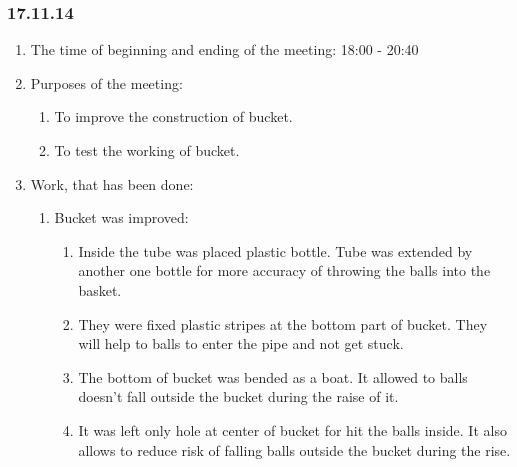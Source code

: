 
\subsubsection{17.11.14}

\begin{enumerate} 
	\item The time of beginning and ending of the meeting:
	18:00 - 20:40
	\item Purposes of the meeting:
	\begin{enumerate}
		\item To improve the construction of bucket.
		
		\item To test the working of bucket.
		
	\end{enumerate}
	
	\item Work, that has been done:
	\begin{enumerate}
		\item Bucket was improved:
		\begin{enumerate}
			\item Inside the tube was placed plastic bottle. Tube was extended by another one bottle for more accuracy of throwing the balls into the basket.
			
			\item They were fixed plastic stripes at the bottom part of bucket. They will help to balls to enter the pipe and not get stuck.
			
			\item The bottom of bucket was bended as a boat. It allowed to balls doesn't fall outside the bucket during the raise of it.
			
			\item It was left only hole at center of bucket for hit the balls inside. It also allows to reduce risk of falling balls outside the bucket during the rise.
			
		\end{enumerate}
		

\end{enumerate}
\end{enumerate}
